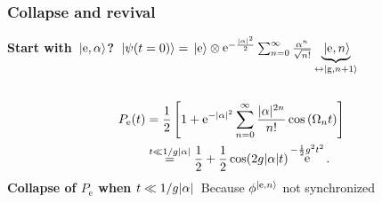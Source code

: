 \documentclass[t]{beamer}
\DeclareMathOperator{\ee}{e}
\begin{document}
\begin{frame}
\frametitle{Collapse and revival}

\textbf{Start with $\ket*{\text{e}, \alpha}$?} $\ket*{\psi(t=0)} = \ket*{\text{e}} \otimes \ee^{- \frac{\abs*{\alpha}^2}{2}} 
\sum_{n=0}^{\infty} \frac{\alpha^n}{\sqrt{n!}} \underbrace{\ket*{\text{e}, n}}_{\leftrightarrow \ket*{\text{g}, n+1}}$

\begin{columns}[T]
    \begin{column}{0.7\textwidth}
        \[
            \begin{aligned}
                P_\text{e}(t) &= \frac{1}{2}\left[1+\mathrm{e}^{-|\alpha|^2} \sum_{n=0}^{\infty} \frac{|\alpha|^{2 n}}{n !} \cos \left(\Omega_n t\right)\right] \\ 
                &\stackrel{t \ll 1 / g \abs*{\alpha}}{=} \frac{1}{2} + \frac{1}{2} \cos (2 g \abs{\alpha} t) \ee^{- \frac{1}{2} g^2 t^2}.
            \end{aligned}
        \]
        \textbf{Collapse of $P_{\text{e}}$ when $t \ll 1 / g \abs*{\alpha}$} 
        Because $\phi^{\ket*{\text{e},n}}$ not synchronized
        

\end{column}
\end{columns}
\end{frame}
\end{document}
